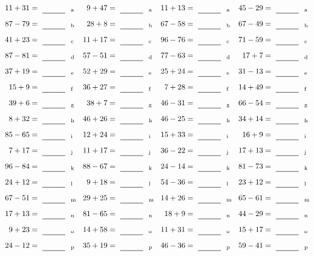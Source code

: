 \documentclass
[
  draft    = true,
  fontsize = 11pt,
  parskip  = half-
]
{scrartcl}
\begin{document}
\clearpage
\begin{align*}
    \pline{11+31}&=\rline{a}
  & \pline{9+47}&=\rline{a}
  & \pline{11+13}&=\rline{a}
  & \pline{45-29}&=\rline{a} \\[1ex]
    \pline{87-79}&=\rline{b}
  & \pline{28+8}&=\rline{b}
  & \pline{67-58}&=\rline{b}
  & \pline{67-49}&=\rline{b} \\[1ex]
    \pline{41+23}&=\rline{c}
  & \pline{11+17}&=\rline{c}
  & \pline{96-76}&=\rline{c}
  & \pline{71-59}&=\rline{c} \\[1ex]
    \pline{87-81}&=\rline{d}
  & \pline{57-51}&=\rline{d}
  & \pline{77-63}&=\rline{d}
  & \pline{17+7}&=\rline{d} \\[1ex]
    \pline{37+19}&=\rline{e}
  & \pline{52+29}&=\rline{e}
  & \pline{25+24}&=\rline{e}
  & \pline{31-13}&=\rline{e} \\[1ex]
    \pline{15+9}&=\rline{f}
  & \pline{36+27}&=\rline{f}
  & \pline{7+28}&=\rline{f}
  & \pline{14+49}&=\rline{f} \\[1ex]
    \pline{39+6}&=\rline{g}
  & \pline{38+7}&=\rline{g}
  & \pline{46-31}&=\rline{g}
  & \pline{66-54}&=\rline{g} \\[1ex]
    \pline{8+32}&=\rline{h}
  & \pline{46+26}&=\rline{h}
  & \pline{46-25}&=\rline{h}
  & \pline{34+14}&=\rline{h} \\[1ex]
    \pline{85-65}&=\rline{i}
  & \pline{12+24}&=\rline{i}
  & \pline{15+33}&=\rline{i}
  & \pline{16+9}&=\rline{i} \\[1ex]
    \pline{7+17}&=\rline{j}
  & \pline{11+17}&=\rline{j}
  & \pline{36-22}&=\rline{j}
  & \pline{17+13}&=\rline{j} \\[1ex]
    \pline{96-84}&=\rline{k}
  & \pline{88-67}&=\rline{k}
  & \pline{24-14}&=\rline{k}
  & \pline{81-73}&=\rline{k} \\[1ex]
    \pline{24+12}&=\rline{l}
  & \pline{9+18}&=\rline{l}
  & \pline{54-36}&=\rline{l}
  & \pline{23+12}&=\rline{l} \\[1ex]
    \pline{67-51}&=\rline{m}
  & \pline{29+25}&=\rline{m}
  & \pline{14+26}&=\rline{m}
  & \pline{65-61}&=\rline{m} \\[1ex]
    \pline{17+13}&=\rline{n}
  & \pline{81-65}&=\rline{n}
  & \pline{18+9}&=\rline{n}
  & \pline{44-29}&=\rline{n} \\[1ex]
    \pline{9+23}&=\rline{o}
  & \pline{14+58}&=\rline{o}
  & \pline{11+31}&=\rline{o}
  & \pline{15+17}&=\rline{o} \\[1ex]
    \pline{24-12}&=\rline{p}
  & \pline{35+19}&=\rline{p}
  & \pline{46-36}&=\rline{p}
  & \pline{59-41}&=\rline{p}
\end{align*}
\end{document}
